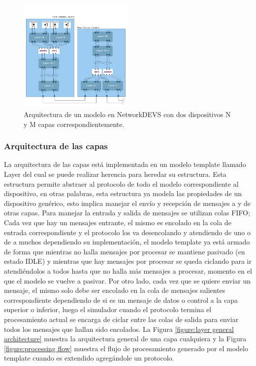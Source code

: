 \documentclass[10pt,a4paper]{article}
\begin{document}
\begin{figure}[htbp]
    \centering
    \includegraphics[width = 0.5\textwidth]{img/png/general_architecture.png}
    \caption{Arquitectura de un modelo en NetworkDEVS con dos dispositivos N y M capas correspondientemente.}
    \label{figure:general architecture}
\end{figure}

\newpage

\subsubsection{Arquitectura de las capas}

La arquitectura de las capas está implementada en un modelo template llamado Layer del cual se puede realizar herencia para heredar su estructura. Esta estructura permite abstraer al protocolo de todo el modelo correspondiente al dispositivo, en otras palabras, esta estructura ya modela las propiedades de un dispositivo genérico, esto implica manejar el envío y recepción de mensajes a y de otras capas. Para manejar la entrada y salida de mensajes se utilizan colas FIFO; Cada vez que hay un mensajes entrante, el mismo es encolado en la cola de entrada correspondiente y el protocolo los va desencolando y atendiendo de uno o de a muchos dependiendo su implementación, el modelo template ya está armado de forma que mientras no halla mensajes por procesar se mantiene pasivado (en estado IDLE) y mientras que hay mensajes por procesar se queda ciclando para ir atendiéndolos a todos hasta que no halla más mensajes a procesar, momento en el que el modelo se vuelve a pasivar. Por otro lado, cada vez que se quiere enviar un mensaje, el mismo solo debe ser encolado en la cola de mensajes salientes correspondiente dependiendo de si es un mensaje de datos o control a la capa superior o inferior, luego el simulador cuando el protocolo termina el procesamiento actual se encarga de ciclar entre las colas de salida para enviar todos los mensajes que hallan sido encolados. La Figura \ref{figure:layer general architecture} muestra la arquitectura general de una capa cualquiera y la Figura \ref{figure:processing flow} muestra el flujo de procesamiento generado por el modelo template cuando es extendido agregándole un protocolo.
\end{document}
